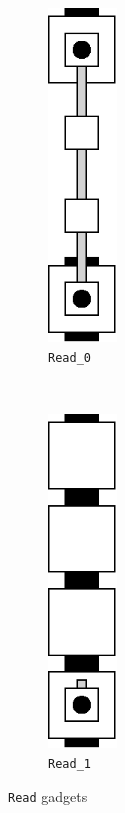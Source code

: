 \begin{figure}[H]
    \centering
    \begin{subfigure}[t]{0.2\textwidth}
        \centering
        \includegraphics[width=0.2\textwidth]{read/read_0}
        \caption{\label{fig:read_0} {\tt Read\_0}}
    \end{subfigure}%
    ~
    \begin{subfigure}[t]{0.2\textwidth}
        \centering
        \includegraphics[width=0.2\textwidth]{read/read_1}
        \caption{\label{fig:read_1} {\tt Read\_1}}
    \end{subfigure}%
    \caption{\label{fig:digit_read} {\tt Read} gadgets}
\end{figure}
